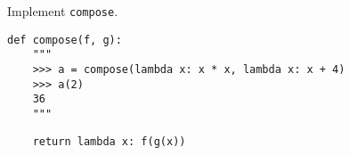 \begin{blocksection}
\question Implement \lstinline$compose$.

\begin{lstlisting}
def compose(f, g):
    """
    >>> a = compose(lambda x: x * x, lambda x: x + 4)
    >>> a(2)
    36
    """
\end{lstlisting}

\begin{solution}[0.25in]
\begin{lstlisting}
    return lambda x: f(g(x))
\end{lstlisting}
\end{solution}
\end{blocksection}
